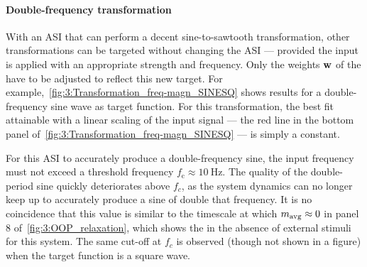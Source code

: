 \paragraph{Double-frequency transformation}
With an ASI that can perform a decent sine-to-sawtooth transformation, other transformations can be targeted without changing the ASI --- provided the input is applied with an appropriate strength and frequency.
Only the weights $\boldsymbol{\mathbf{w}}$ of the  have to be adjusted to reflect this new target.
For example,~\cref{fig:3:Transformation_freq-magn_SINESQ} shows results for a double-frequency sine wave as target function.
For this transformation, the best fit attainable with a linear scaling of the input signal --- the red line in the bottom panel of~\cref{fig:3:Transformation_freq-magn_SINESQ} --- is simply a constant.


For this ASI  to accurately produce a double-frequency sine, the input frequency must not exceed a threshold frequency $f_\mathrm{c} \approx \SI{10}{\hertz}$.
The quality of the double-period sine quickly deteriorates above $f_c$, as the system dynamics can no longer keep up to accurately produce a sine of double that frequency.
It is no coincidence that this value is similar to the timescale at which $m_\mathrm{avg} \approx 0$ in panel 8 of~\cref{fig:3:OOP_relaxation}, which shows the  in the absence of external stimuli for this system.
The same cut-off at $f_c$ is observed (though not shown in a figure) when the target function is a square wave.

